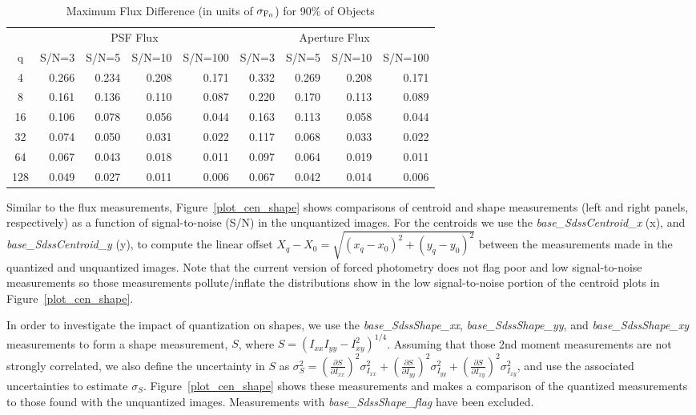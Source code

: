 \begin{table}[ht]
\caption{Maximum Flux Difference (in units of $\sigma_{\rm F_0}$) for 90\% of Objects}
\centering
\begin{tabular}[]{c|rrrr|rrrr}
\hline
     &  \multicolumn{4}{c}{PSF Flux}  & \multicolumn{4}{c}{Aperture Flux} \\
 q   &  S/N=3 & S/N=5 & S/N=10 & S/N=100 & S/N=3 & S/N=5 & S/N=10 & S/N=100  \\
\hline
   4 &  0.266 & 0.234 & 0.208  & 0.171 &   0.332 & 0.269 & 0.208 & 0.171 \\
   8 &  0.161 & 0.136 & 0.110  & 0.087 &   0.220 & 0.170 & 0.113 & 0.089 \\
  16 &  0.106 & 0.078 & 0.056  & 0.044 &   0.163 & 0.113 & 0.058 & 0.044 \\
  32 &  0.074 & 0.050 & 0.031  & 0.022 &   0.117 & 0.068 & 0.033 & 0.022 \\
  64 &  0.067 & 0.043 & 0.018  & 0.011 &   0.097 & 0.064 & 0.019 & 0.011 \\
 128 &  0.049 & 0.027 & 0.011  & 0.006 &   0.067 & 0.042 & 0.014 & 0.006 \\
\hline
\end{tabular}
\label{tab_se_flux_diff}
\end{table}


Similar to the flux measurements, Figure~\ref{plot_cen_shape} shows comparisons of centroid
and shape measurements (left and right panels, respectively) as a function of signal-to-noise
(S/N) in the unquantized images.  For the centroids we use the {\it base\_SdssCentroid\_x} (x), and 
{\it base\_SdssCentroid\_y} (y), to compute the linear offset 
$X_q-X_0 = \sqrt{ (x_q-x_0)^2 + (y_q-y_0)^2}$ between the measurements
made in the quantized and unquantized images.  Note that the current version of forced photometry 
does not flag poor and low signal-to-noise measurements so those measurements pollute/inflate the 
distributions show in the low signal-to-noise portion of the centroid plots in Figure~\ref{plot_cen_shape}.

In order to investigate the impact of quantization on shapes, we use the {\it base\_SdssShape\_xx}, 
{\it base\_SdssShape\_yy}, and {\it base\_SdssShape\_xy} measurements to form a shape measurement, 
$S$, where $S=(I_{xx} I_{yy} - I_{xy}^2)^{1/4}$.
Assuming that those 2nd moment measurements are not strongly correlated, we also define
the uncertainty in $S$ as 
$\sigma_S^2 = (\frac{\partial S}{\partial I_{xx}})^2 \sigma_{I_{xx}}^2 + 
(\frac{\partial S}{\partial I_{yy}})^2 \sigma_{I_{yy}}^2 + 
(\frac{\partial S}{\partial I_{xy}})^2 \sigma_{I_{xy}}^2$, and use the associated uncertainties
to estimate $\sigma_S$.  Figure~\ref{plot_cen_shape} shows these measurements and makes a comparison
of the quantized measurements to those found with the unquantized images.  Measurements with 
{\it base\_SdssShape\_flag} have been excluded.

